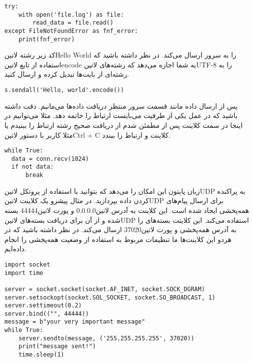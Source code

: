 \documentclass[]{article}
\begin{document}
  \begin{latin}
  \begin{verbatim}
try:
    with open('file.log') as file:
        read_data = file.read()
except FileNotFoundError as fnf_error:
    print(fnf_error)
  \end{verbatim}
  \end{latin}

  کد زیر رشته ‌لاتین{Hello World} را به سرور ارسال می‌کند. در نظر داشته باشید که استفاده از تابع ‌لاتین{encode}
  به شما اجازه می‌دهد که رشته‌های ‌لاتین{UTF-8} را به رشته‌ای از بایت‌ها تبدیل کرده و ارسال کنید.

  \begin{latin}
  \begin{verbatim}
s.sendall('Hello, world'.encode())
  \end{verbatim}
  \end{latin}

  پس از ارسال داده مانند قسمت سرور منتظر دریافت داده‌ها می‌مانیم. دقت داشته باشید که در عمل یکی از طرفیت می‌بایست ارتباط را خاتمه دهد.
  مثلا می‌توانیم در اینجا در سمت کلاینت پس از مطمئن شدم از دریافت صحیح رشته ارتباط را ببنیدم یا مثلا کاربر با دستور ‌لاتین{Ctrl + C}
  کلاینت و ارتباط را ببندد.

  \begin{latin}
  \begin{verbatim}
while True:
  data = conn.recv(1024)
  if not data:
      break
  \end{verbatim}
  \end{latin}

  زبان پایتون این امکان را می‌دهد که بتوانید با استفاده از پروتکل ‌لاتین{UDP} به پراکنده کردن داده بپردازید.
  در مثال پیشرو یک کلاینت ‌لاتین{UDP} برای ارسال پیام‌های همه‌پخشی ایجاد شده است.
  این کلاینت به آدرس ‌لاتین{0.0.0.0} و پورت ‌لاتین{44444} بسته شده و از آن برای دریافت بسته‌های ‌لاتین{UDP} استفاده می‌کند.
  این کلاینت بسته‌های را به آدرس همه‌پخشی و پورت ‌لاتین{37020} ارسال می‌کند.
  در نظر داشته باشید که در هردو این کلاینت‌ها ما تنظیمات مربوط به استفاده از وضعیت همه‌پخشی را انجام داده‌ایم.

  \begin{latin}
  \begin{verbatim}
import socket
import time

server = socket.socket(socket.AF_INET, socket.SOCK_DGRAM)
server.setsockopt(socket.SOL_SOCKET, socket.SO_BROADCAST, 1)
server.settimeout(0.2)
server.bind(("", 44444))
message = b"your very important message"
while True:
    server.sendto(message, ('255.255.255.255', 37020))
    print("message sent!")
    time.sleep(1)
  \end{verbatim}
  \end{latin}
\end{document}
